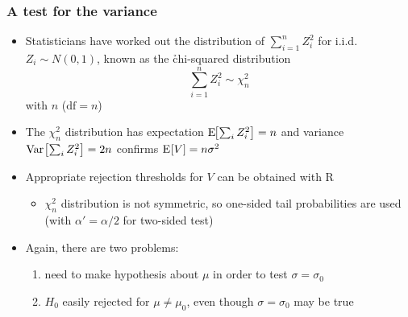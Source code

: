 \documentclass[handout,notes=show,t]{beamer} %
\begin{document}
\begin{frame}
  \frametitle{A test for the variance}
  
  \begin{itemize}
  \item Statisticians have worked out the distribution of $\sum_{i=1}^n Z_i^2$
    for i.i.d.\ $Z_i\sim N(0,1)$, known as the \h{chi-squared distribution}
    \[
    \sum_{i=1}^n Z_i^2 \sim \chi^2_n
    \]
    with $n$  ($\text{df} = n$)
  \item The $\chi^2_n$ distribution has expectation $\mathrm{E}_{}\!\bigl[\sum_i Z_i^2\bigr] =
    n$ and variance $\mathop{\mathrm{Var}}_{}\bigl[\sum_i Z_i^2\bigr] = 2n$ \so confirms $\mathrm{E}_{}[V] = n \sigma^2$%
    \pause
  \item Appropriate rejection thresholds for $V$ can be obtained with R
    \begin{itemize}
    \item $\chi^2_n$ distribution is not symmetric, so one-sided tail
      probabilities are used (with $\alpha' = \alpha/2$ for two-sided test)
    \end{itemize}
    \pause
  \item Again, there are two problems:
    \begin{enumerate}
    \item need to make hypothesis about $\mu$ in order to test $\sigma = \sigma_0$
    \item $H_0$ easily rejected for $\mu \neq \mu_0$, even though
      $\sigma=\sigma_0$ may be true
    \end{enumerate}
  \end{itemize}
\end{frame}
\end{document}
